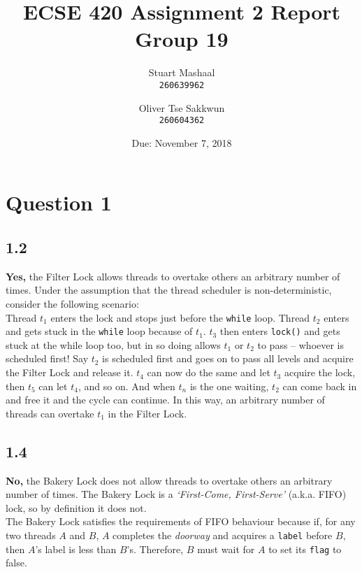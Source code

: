 \documentclass[11pt, letterpaper]{article}
\title{ECSE 420 Assignment 2 Report\\Group 19}
\author{
    Stuart Mashaal\\
    \texttt{260639962}
    \and
    Oliver Tse Sakkwun\\
    \texttt{260604362}
}
\date{Due: November 7, 2018}
\newcommand{\code}[1] { \texttt{#1} }
\begin{document}
\begin{titlepage}
    \maketitle
    \thispagestyle{empty}
    \setcounter{page}{0}
\end{titlepage}

\section*{Question 1}
\label{sec:question_1}

\subsection*{1.2}
\label{sub:1_2}

\textbf{Yes,} the Filter Lock allows threads to overtake others an arbitrary number of times. Under the assumption that the thread scheduler is non-deterministic, consider the following scenario:\\

Thread $t_1$ enters the lock and stops just before the \code{while} loop. Thread $t_2$ enters and gets stuck in the \code{while} loop because of $t_1$. $t_3$ then enters \code{lock()} and gets stuck at the while loop too, but in so doing allows $t_1$ or $t_2$ to pass -- whoever is scheduled first! Say $t_2$ is scheduled first and goes on to pass all levels and acquire the Filter Lock and release it. $t_4$ can now do the same and let $t_3$ acquire the lock, then $t_5$ can let $t_4$, and so on. And when $t_n$ is the one waiting, $t_2$ can come back in and free it and the cycle can continue. In this way, an arbitrary number of threads can overtake $t_1$ in the Filter Lock.

\subsection*{1.4}
\label{sub:1_4}

\textbf{No,} the Bakery Lock does not allow threads to overtake others an arbitrary number of times. The Bakery Lock is a \textit{`First-Come, First-Serve'} (a.k.a. FIFO) lock, so by definition it does not.\\

The Bakery Lock satisfies the requirements of FIFO behaviour because if, for any two threads $A$ and $B$, $A$ completes the \textit{doorway} and acquires a \code{label} before $B$, then $A$'s label is less than $B$'s. Therefore, $B$ must wait for $A$ to set its \code{flag} to false.\\
\end{document}
